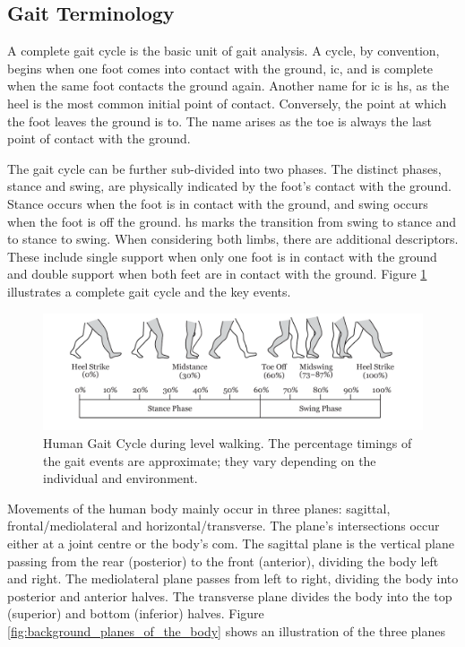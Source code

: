 \subsection{Gait Terminology}
A complete gait cycle is the basic unit of gait analysis. A cycle, by convention, begins when one foot comes into contact with the ground, \acrfull{ic}, and is complete when the same foot contacts the ground again. Another name for \acrshort{ic} is \acrfull{hs}, as the heel is the most common initial point of contact. Conversely, the point at which the foot leaves the ground is \acrfull{to}. The name arises as the toe is always the last point of contact with the ground.\cite{Novacheck1998, Shah2020}

The gait cycle can be further sub-divided into two phases. The distinct phases, stance and swing, are physically indicated by the foot's contact with the ground. Stance occurs when the foot is in contact with the ground, and swing occurs when the foot is off the ground. \acrshort{hs} marks the transition from swing to stance and \acrshort{to} stance to swing. When considering both limbs, there are additional descriptors. These include single support when only one foot is in contact with the ground and double support when both feet are in contact with the ground. Figure \ref{fig:background_gait_cycle} illustrates a complete gait cycle and the key events.\cite{Novacheck1998, Shah2020}

\begin{figure}[!hbt]
    \centering
    \includegraphics[width=\textwidth]{content/4-LSTM_Behaviour/Gait_Cycle.pdf}
    \caption[Human Gait Cycle during level walking]{Human Gait Cycle during level walking. The percentage timings of the gait events are approximate; they vary depending on the individual and environment.\cite{Sherratt2021}}
    \label{fig:background_gait_cycle}
\end{figure}

Movements of the human body mainly occur in three planes: sagittal, frontal/mediolateral and horizontal/transverse. The plane's intersections occur either at a joint centre or the body's \acrfull{com}. The sagittal plane is the vertical plane passing from the rear (posterior) to the front (anterior), dividing the body left and right. The mediolateral plane passes from left to right, dividing the body into posterior and anterior halves. The transverse plane divides the body into the top (superior) and bottom (inferior) halves.\cite{Bartlett2007} Figure \ref{fig:background_planes_of_the_body} shows an illustration of the three planes

